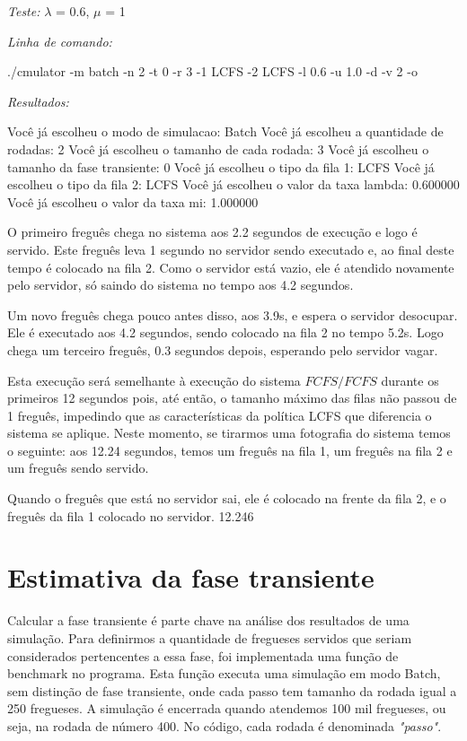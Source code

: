 \documentclass[a4paper,10pt]{article}
\begin{document}
\emph{Teste:} $\lambda$ = 0.6, $\mu$ = 1

\emph{Linha de comando:}

./cmulator -m batch -n 2 -t 0 -r 3 -1 LCFS -2 LCFS -l 0.6 -u 1.0 -d -v 2 -o

\emph{Resultados:}

Você já escolheu o modo de simulacao: Batch
Você já escolheu a quantidade de rodadas: 2
Você já escolheu o tamanho de cada rodada: 3
Você já escolheu o tamanho da fase transiente: 0
Você já escolheu o tipo da fila 1: LCFS
Você já escolheu o tipo da fila 2: LCFS
Você já escolheu o valor da taxa lambda: 0.600000
Você já escolheu o valor da taxa mi: 1.000000

    O primeiro freguês chega no sistema aos 2.2 segundos de execução e logo é servido. Este freguês leva 1 segundo no servidor sendo executado e, ao final deste tempo é colocado na fila 2. Como o servidor está vazio, ele é atendido novamente pelo servidor, só saindo do sistema no tempo aos 4.2 segundos. 

    Um novo freguês chega pouco antes disso, aos 3.9s, e espera o servidor desocupar. Ele é executado aos 4.2 segundos, sendo colocado na fila 2 no tempo 5.2s. Logo chega um terceiro freguês, 0.3 segundos depois, esperando pelo servidor vagar.

    Esta execução será semelhante à execução do sistema $FCFS/FCFS$ durante os primeiros 12 segundos pois, até então, o tamanho máximo das filas não passou de 1 freguês, impedindo que as características da política LCFS que diferencia o sistema se aplique. Neste momento, se tirarmos uma fotografia do sistema temos o seguinte: aos 12.24 segundos, temos um freguês na fila 1, um freguês na fila 2 e um freguês sendo servido.

    Quando o freguês que está no servidor sai, ele é colocado na frente da fila 2, e o freguês da fila 1 colocado no servidor. 12.246




\pagebreak

\section{Estimativa da fase transiente}

    Calcular a fase transiente é parte chave na análise dos resultados de uma simulação. Para definirmos a quantidade de fregueses servidos que seriam considerados pertencentes a essa fase, foi implementada uma função de benchmark no programa. Esta função executa uma simulação em modo Batch, sem distinção de fase transiente, onde cada passo tem tamanho da rodada igual a 250 fregueses. A simulação é encerrada quando atendemos 100 mil fregueses, ou seja, na rodada de número 400. No código, cada rodada é denominada \emph{"passo"}.
\end{document}
